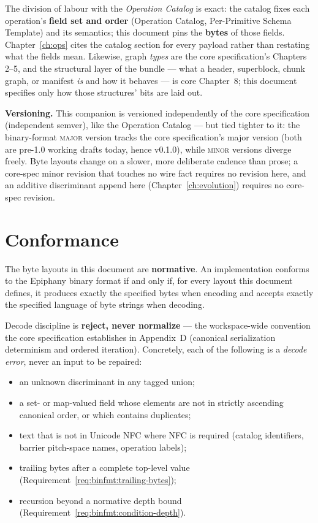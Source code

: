\documentclass[11pt,letterpaper]{report}
\newcommand{\sectionsc}[1]{{\addfontfeatures{Letters=SmallCaps}#1}}
\begin{document}
The division of labour with the \emph{Operation Catalog} is exact: the
catalog fixes each operation's \textbf{field set and order} (Operation
Catalog, \sectionsc{Per-Primitive Schema Template}) and its semantics; this
document pins the \textbf{bytes} of those fields. Chapter~\ref{ch:ops} cites
the catalog section for every payload rather than restating what the fields
mean. Likewise, graph \emph{types} are the core specification's Chapters 2--5,
and the structural layer of the bundle --- what a header, superblock, chunk
graph, or manifest \emph{is} and how it behaves --- is core Chapter~8; this
document specifies only how those structures' bits are laid out.

\begin{rationale}
\textbf{Versioning.} This companion is versioned independently of the core
specification (independent semver), like the Operation Catalog --- but tied
tighter to it: the binary-format \textsc{major} version tracks the core
specification's major version (both are pre-1.0 working drafts today, hence
v0.1.0), while \textsc{minor} versions diverge freely. Byte layouts change on
a slower, more deliberate cadence than prose; a core-spec minor revision that
touches no wire fact requires no revision here, and an additive discriminant
append here (Chapter~\ref{ch:evolution}) requires no core-spec revision.
\end{rationale}

\section{Conformance}
\label{sec:about:conformance}

The byte layouts in this document are \textbf{normative}. An implementation
conforms to the Epiphany binary format if and only if, for every layout this
document defines, it produces exactly the specified bytes when encoding and
accepts exactly the specified language of byte strings when decoding.

Decode discipline is \textbf{reject, never normalize} --- the workspace-wide
convention the core specification establishes in Appendix~D (canonical
serialization determinism and ordered iteration). Concretely, each of the
following is a \emph{decode error}, never an input to be repaired:

\begin{itemize}
  \item an unknown discriminant in any tagged union;
  \item a set- or map-valued field whose elements are not in strictly
    ascending canonical order, or which contains duplicates;
  \item text that is not in Unicode NFC where NFC is required (catalog
    identifiers, barrier pitch-space names, operation labels);
  \item trailing bytes after a complete top-level value
    (Requirement~\ref{req:binfmt:trailing-bytes});
  \item recursion beyond a normative depth bound
    (Requirement~\ref{req:binfmt:condition-depth}).
\end{itemize}
\end{document}

